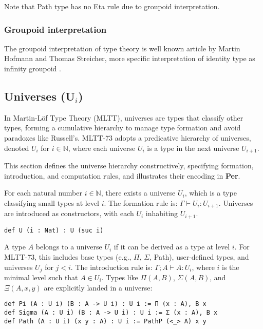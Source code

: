 \documentclass{article}
\begin{document}
Note that Path type has no Eta rule due to groupoid interpretation.

\subsubsection*{Groupoid interpretation}
The groupoid interpretation of type theory is well known article by Martin Hofmann and Thomas Streicher,
more specific interpretation of identity type as infinity groupoid \cite{Hofmann96}.

\subsection{Universes (U$_i$)}
In Martin-Löf Type Theory (MLTT), universes are types that classify other types,
forming a cumulative hierarchy to manage type formation and avoid paradoxes like
Russell’s. MLTT-73 adopts a predicative hierarchy
of universes, denoted \( U_i \) for \( i \in \mathbb{N} \), where each
universe \( U_i \) is a type in the next universe \( U_{i+1} \).

This section defines the universe hierarchy constructively,
specifying formation, introduction, and computation rules,
and illustrates their encoding in \textbf{Per}.

\begin{definition}
For each natural number \( i \in \mathbb{N} \), there exists a universe \( U_i \), which is a type classifying small types at level \( i \). The formation rule is:
$\Gamma \vdash U_i : U_{i+1}$.
Universes are introduced as constructors, with each \( U_i \) inhabiting \( U_{i+1} \).
\begin{lstlisting}[mathescape=true]
def U (i : Nat) : U (suc i)
\end{lstlisting}
\end{definition}

\begin{definition}
A type \( A \) belongs to a universe \( U_i \) if it can be derived as a type at
level \( i \). For MLTT-73, this includes base types (e.g., \( \Pi \), \( \Sigma \), Path),
user-defined types, and universes \( U_j \) for \( j < i \). The introduction rule is:
$\Gamma ; A \vdash A : U_i$, where $i$ is the minimal level such that $A \in U_i$.
Types like \( \Pi(A, B) \), \( \Sigma(A, B) \), and \( \Xi(A, x, y) \) are
explicitly landed in a universe:
\begin{lstlisting}[mathescape=true]
def Pi (A : U i) (B : A -> U i) : U i := Π (x : A), B x
def Sigma (A : U i) (B : A -> U i) : U i := Σ (x : A), B x
def Path (A : U i) (x y : A) : U i := PathP (<_> A) x y
\end{lstlisting}
\end{definition}
\end{document}
